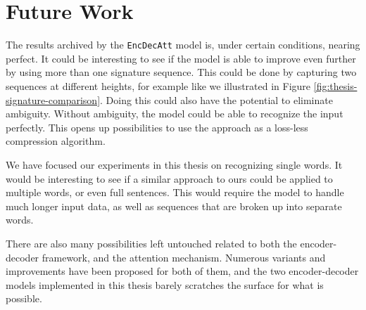 
\section{Future Work}
\label{sec:future_work}
The results archived by the {\tt EncDecAtt} model is, under certain conditions, nearing perfect. It could be interesting to see if the model is able to improve even further by using more than one signature sequence. This could be done by capturing two sequences at different heights, for example like we illustrated in Figure \ref{fig:thesis-signature-comparison}. Doing this could also have the potential to eliminate ambiguity. Without ambiguity, the model could be able to recognize the input perfectly. This opens up possibilities to use the approach as a loss-less compression algorithm.

We have focused our experiments in this thesis on recognizing single words. It would be interesting to see if a similar approach to ours could be applied to multiple words, or even full sentences. This would require the model to handle much longer input data, as well as sequences that are broken up into separate words.

There are also many possibilities left untouched related to both the encoder-decoder framework, and the attention mechanism. Numerous variants and improvements have been proposed for both of them, and the two encoder-decoder models implemented in this thesis barely scratches the surface for what is possible. 